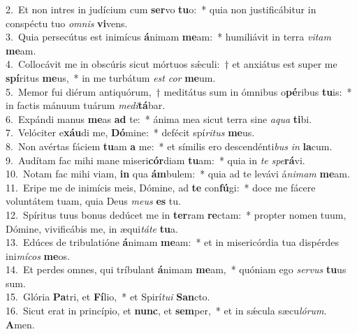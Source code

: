 {2.~}Et non intres in judícium cum \textbf{ser}vo \textbf{tu}o:~* quia non justificábitur in conspéctu tuo \textit{om}\textit{nis} \textbf{vi}vens.\\
{3.~}Quia persecútus est inimícus \textbf{á}nimam \textbf{me}am:~* humiliávit in terra \textit{vi}\textit{tam} \textbf{me}am.\\
{4.~}Collocávit me in obscúris sicut mórtuos sǽculi:~† et anxiátus est super me \textbf{spí}ritus \textbf{me}us,~* in me turbátum \textit{est} \textit{cor} \textbf{me}um.\\
{5.~}Memor fui diérum antiquórum,~† meditátus sum in ómnibus o\textbf{pé}ribus \textbf{tu}is:~* in factis mánuum tuárum \textit{me}\textit{di}\textbf{tá}bar.\\
{6.~}Expándi manus \textbf{me}as \textbf{ad} te:~* ánima mea sicut terra sine \textit{a}\textit{qua} \textbf{ti}bi.\\
{7.~}Velóciter e\textbf{xáu}di me, \textbf{Dó}mine:~* defécit spí\textit{ri}\textit{tus} \textbf{me}us.\\
{8.~}Non avértas fáciem \textbf{tu}am \textbf{a} me:~* et símilis ero descendénti\textit{bus} \textit{in} \textbf{la}cum.\\
{9.~}Audítam fac mihi mane miseri\textbf{cór}diam \textbf{tu}am:~* quia in \textit{te} \textit{spe}\textbf{rá}vi.\\
{10.~}Notam fac mihi viam, \textbf{in} qua \textbf{ám}bulem:~* quia ad te levávi á\textit{ni}\textit{mam} \textbf{me}am.\\
{11.~}Eripe me de inimícis meis, Dómine, ad \textbf{te} con\textbf{fú}gi:~* doce me fácere voluntátem tuam, quia Deus \textit{me}\textit{us} \textbf{es} tu.\\
{12.~}Spíritus tuus bonus dedúcet me in \textbf{ter}ram \textbf{re}ctam:~* propter nomen tuum, Dómine, vivificábis me, in æqui\textit{tá}\textit{te} \textbf{tu}a.\\
{13.~}Edúces de tribulatióne \textbf{á}nimam \textbf{me}am:~* et in misericórdia tua dispérdes ini\textit{mí}\textit{cos} \textbf{me}os.\\
{14.~}Et perdes omnes, qui tríbulant \textbf{á}nimam \textbf{me}am,~* quóniam ego \textit{ser}\textit{vus} \textbf{tu}us sum.\\
{15.~}Glória \textbf{Pa}tri, et \textbf{Fí}lio,~* et Spirí\textit{tu}\textit{i} \textbf{San}cto.\\
{16.~}Sicut erat in princípio, et \textbf{nunc}, et \textbf{sem}per,~* et in sǽcula sæcu\textit{ló}\textit{rum}. \textbf{A}men.\\
